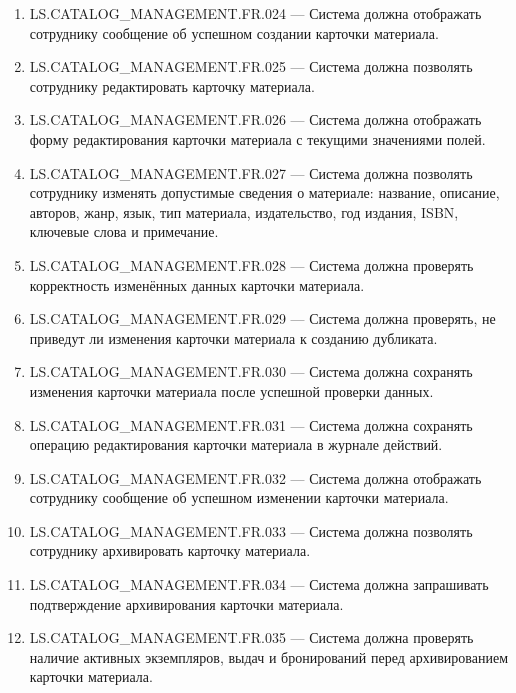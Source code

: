 \documentclass[12pt,a4paper]{article}
\begin{document}
\begin{enumerate}
		\item LS.CATALOG\_MANAGEMENT.FR.024 --- Система должна отображать сотруднику
		сообщение об успешном создании карточки материала.
		
		\item LS.CATALOG\_MANAGEMENT.FR.025 --- Система должна позволять сотруднику
		редактировать карточку материала.
		
		\item LS.CATALOG\_MANAGEMENT.FR.026 --- Система должна отображать форму
		редактирования карточки материала с текущими значениями полей.
		
		\item LS.CATALOG\_MANAGEMENT.FR.027 --- Система должна позволять сотруднику
		изменять допустимые сведения о материале: название, описание, авторов, жанр,
		язык, тип материала, издательство, год издания, ISBN, ключевые слова и примечание.
		
		\item LS.CATALOG\_MANAGEMENT.FR.028 --- Система должна проверять корректность
		изменённых данных карточки материала.
		
		\item LS.CATALOG\_MANAGEMENT.FR.029 --- Система должна проверять, не приведут ли
		изменения карточки материала к созданию дубликата.
		
		\item LS.CATALOG\_MANAGEMENT.FR.030 --- Система должна сохранять изменения
		карточки материала после успешной проверки данных.
		
		\item LS.CATALOG\_MANAGEMENT.FR.031 --- Система должна сохранять операцию
		редактирования карточки материала в журнале действий.
		
		\item LS.CATALOG\_MANAGEMENT.FR.032 --- Система должна отображать сотруднику
		сообщение об успешном изменении карточки материала.
		
		\item LS.CATALOG\_MANAGEMENT.FR.033 --- Система должна позволять сотруднику
		архивировать карточку материала.
		
		\item LS.CATALOG\_MANAGEMENT.FR.034 --- Система должна запрашивать подтверждение
		архивирования карточки материала.
		
		\item LS.CATALOG\_MANAGEMENT.FR.035 --- Система должна проверять наличие активных
		экземпляров, выдач и бронирований перед архивированием карточки материала.
		

\end{enumerate}
\end{document}
